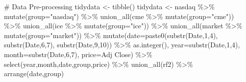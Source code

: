 \documentclass[
  a4paper,
  DIV=11,
  numbers=noendperiod]{scrreprt}
\newenvironment{Shaded}{\begin{snugshade}}{\end{snugshade}}
\newcommand{\AttributeTok}[1]{\textcolor[rgb]{0.40,0.45,0.13}{#1}}
\newcommand{\CommentTok}[1]{\textcolor[rgb]{0.37,0.37,0.37}{#1}}
\newcommand{\DecValTok}[1]{\textcolor[rgb]{0.68,0.00,0.00}{#1}}
\newcommand{\FunctionTok}[1]{\textcolor[rgb]{0.28,0.35,0.67}{#1}}
\newcommand{\NormalTok}[1]{\textcolor[rgb]{0.00,0.23,0.31}{#1}}
\newcommand{\OtherTok}[1]{\textcolor[rgb]{0.00,0.23,0.31}{#1}}
\newcommand{\SpecialCharTok}[1]{\textcolor[rgb]{0.37,0.37,0.37}{#1}}
\newcommand{\StringTok}[1]{\textcolor[rgb]{0.13,0.47,0.30}{#1}}
\begin{document}
\begin{Shaded}
\begin{Highlighting}[]
\CommentTok{\# Data Pre{-}processing}
\NormalTok{tidydata }\OtherTok{\textless{}{-}} \FunctionTok{tibble}\NormalTok{()}
\NormalTok{tidydata }\OtherTok{\textless{}{-}}\NormalTok{ nasdaq }\SpecialCharTok{\%\textgreater{}\%} 
  \FunctionTok{mutate}\NormalTok{(}\AttributeTok{group=}\StringTok{"nasdaq"}\NormalTok{) }\SpecialCharTok{\%\textgreater{}\%} 
  \FunctionTok{union\_all}\NormalTok{(cme }\SpecialCharTok{\%\textgreater{}\%} \FunctionTok{mutate}\NormalTok{(}\AttributeTok{group=}\StringTok{"cme"}\NormalTok{)) }\SpecialCharTok{\%\textgreater{}\%} 
  \FunctionTok{union\_all}\NormalTok{(ice }\SpecialCharTok{\%\textgreater{}\%} \FunctionTok{mutate}\NormalTok{(}\AttributeTok{group=}\StringTok{"ice"}\NormalTok{)) }\SpecialCharTok{\%\textgreater{}\%} 
  \FunctionTok{union\_all}\NormalTok{(market }\SpecialCharTok{\%\textgreater{}\%} \FunctionTok{mutate}\NormalTok{(}\AttributeTok{group=}\StringTok{"market"}\NormalTok{)) }\SpecialCharTok{\%\textgreater{}\%} 
  \FunctionTok{mutate}\NormalTok{(}\AttributeTok{date=}\FunctionTok{paste0}\NormalTok{(}\FunctionTok{substr}\NormalTok{(Date,}\DecValTok{1}\NormalTok{,}\DecValTok{4}\NormalTok{),}
                     \FunctionTok{substr}\NormalTok{(Date,}\DecValTok{6}\NormalTok{,}\DecValTok{7}\NormalTok{),}
                     \FunctionTok{substr}\NormalTok{(Date,}\DecValTok{9}\NormalTok{,}\DecValTok{10}\NormalTok{)) }\SpecialCharTok{\%\textgreater{}\%} \FunctionTok{as.integer}\NormalTok{(),}
         \AttributeTok{year=}\FunctionTok{substr}\NormalTok{(Date,}\DecValTok{1}\NormalTok{,}\DecValTok{4}\NormalTok{),}
         \AttributeTok{month=}\FunctionTok{substr}\NormalTok{(Date,}\DecValTok{6}\NormalTok{,}\DecValTok{7}\NormalTok{),}
         \AttributeTok{price=}\StringTok{\textasciigrave{}}\AttributeTok{Adj Close}\StringTok{\textasciigrave{}}\NormalTok{) }\SpecialCharTok{\%\textgreater{}\%} 
  \FunctionTok{select}\NormalTok{(year,month,date,group,price) }\SpecialCharTok{\%\textgreater{}\%} 
  \FunctionTok{union\_all}\NormalTok{(rf2) }\SpecialCharTok{\%\textgreater{}\%} 
  \FunctionTok{arrange}\NormalTok{(date,group)}


\end{Highlighting}
\end{Shaded}
\end{document}
